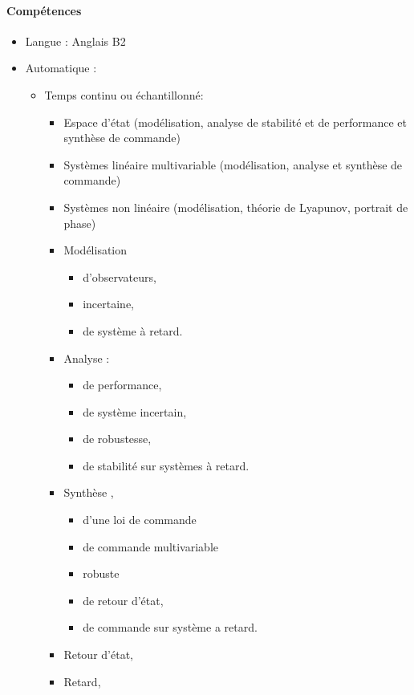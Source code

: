 \documentclass{article}
\begin{document}
\paragraph{Compétences}
\begin{itemize}

\item Langue : Anglais B2

\item Automatique :
	\begin{itemize}
	\item Temps continu ou échantillonné:
		\begin{itemize}
		\item Espace d'état (modélisation, analyse de stabilité et de performance et synthèse de commande)	
		\item Systèmes linéaire multivariable (modélisation, analyse et synthèse de commande)
		\item Systèmes non linéaire (modélisation, théorie de Lyapunov, portrait de phase)
		
		\item Modélisation 
			\begin{itemize}

			\item d'observateurs, 
			\item incertaine,
			\item de système à retard.
			\end{itemize}		 
		\item Analyse : 
			\begin{itemize}
			\item de performance,
			\item de système incertain,
			\item de robustesse, 
			\item de stabilité sur systèmes à retard.
			\end{itemize}
		\item Synthèse , 		
			\begin{itemize}
			\item d'une loi de commande
			\item de commande multivariable
			\item robuste
			\item de retour d'état, 
			\item de commande sur système a retard.
			\end{itemize}
		\item Retour d'état,
		\item Retard, %
		\end{itemize}
		

\end{itemize}
\end{itemize}
\end{document}
